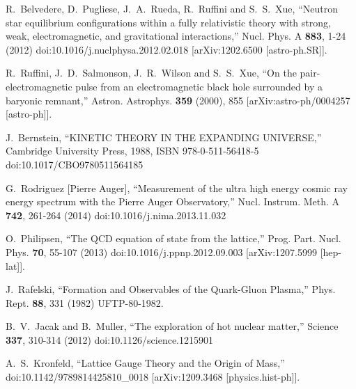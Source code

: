 \documentclass[universe,article,submit,moreauthors,pdftex,a4paper]{Definitions/mdpi}
\begin{document}
\begin{thebibliography}{99}
R.~Belvedere, D.~Pugliese, J.~A.~Rueda, R.~Ruffini and S.~S.~Xue,
``Neutron star equilibrium configurations within a fully relativistic theory with strong, weak, electromagnetic, and gravitational interactions,''
Nucl. Phys. A \textbf{883}, 1-24 (2012)
doi:10.1016/j.nuclphysa.2012.02.018
[arXiv:1202.6500 [astro-ph.SR]].

R.~Ruffini, J.~D.~Salmonson, J.~R.~Wilson and S.~S.~Xue,
``On the pair-electromagnetic pulse from an electromagnetic black hole surrounded by a baryonic
remnant,''
Astron. Astrophys. \textbf{359} (2000), 855
[arXiv:astro-ph/0004257 [astro-ph]].

J.~Bernstein,
``KINETIC THEORY IN THE EXPANDING UNIVERSE,''
Cambridge University Press, 1988,
ISBN 978-0-511-56418-5
doi:10.1017/CBO9780511564185

G.~Rodriguez [Pierre Auger],
``Measurement of the ultra high energy cosmic ray energy spectrum with the Pierre Auger Observatory,''
Nucl. Instrum. Meth. A \textbf{742}, 261-264 (2014)
doi:10.1016/j.nima.2013.11.032

O.~Philipsen,
``The QCD equation of state from the lattice,''
Prog. Part. Nucl. Phys. \textbf{70}, 55-107 (2013)
doi:10.1016/j.ppnp.2012.09.003
[arXiv:1207.5999 [hep-lat]].

J.~Rafelski,
``Formation and Observables of the Quark-Gluon Plasma,''
Phys. Rept. \textbf{88}, 331 (1982)
UFTP-80-1982.

B.~V.~Jacak and B.~Muller,
``The exploration of hot nuclear matter,''
Science \textbf{337}, 310-314 (2012)
doi:10.1126/science.1215901

A.~S.~Kronfeld,
``Lattice Gauge Theory and the Origin of Mass,''
doi:10.1142/9789814425810\_0018
[arXiv:1209.3468 [physics.hist-ph]].


\end{thebibliography}
\end{document}
